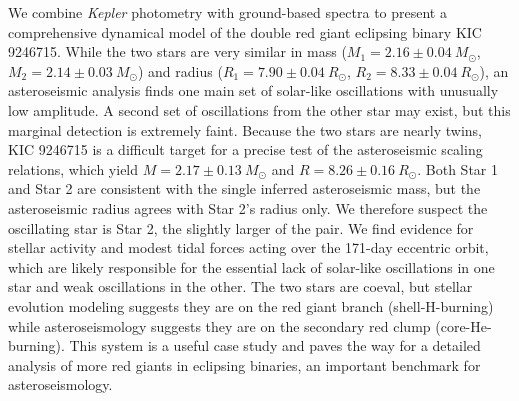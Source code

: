 We combine \emph{Kepler} photometry with ground-based spectra to present a comprehensive dynamical model of the double red giant eclipsing binary KIC 9246715. While the two stars are very similar in mass ($M_1 = 2.16 \pm 0.04\ M_{\odot}$, $M_2 = 2.14 \pm 0.03\ M_{\odot}$) and radius ($R_1 = 7.90 \pm 0.04 \ R_{\odot}$, $R_2 = 8.33 \pm 0.04 \ R_{\odot}$), an asteroseismic analysis finds one main set of solar-like oscillations with unusually low amplitude. A second set of oscillations from the other star may exist, but this marginal detection is extremely faint. Because the two stars are nearly twins, KIC 9246715 is a difficult target for a precise test of the asteroseismic scaling relations, which yield $M = 2.17 \pm 0.13 \ M_{\odot}$ and $R = 8.26 \pm 0.16 \ R_{\odot}$. Both Star 1 and Star 2 are consistent with the single inferred asteroseismic mass, but the asteroseismic radius agrees with Star 2's radius only. We therefore suspect the oscillating star is Star 2, the slightly larger of the pair. We find evidence for stellar activity and modest tidal forces acting over the 171-day eccentric orbit, which are likely responsible for the essential lack of solar-like oscillations in one star and weak oscillations in the other. The two stars are coeval, but stellar evolution modeling suggests they are on the red giant branch (shell-H-burning) while asteroseismology suggests they are on the secondary red clump (core-He-burning). This system is a useful case study and paves the way for a detailed analysis of more red giants in eclipsing binaries, an important benchmark for asteroseismology.
  
  
  